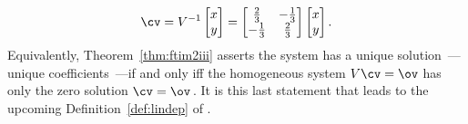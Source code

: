 \begin{example}
\begin{solution}
\begin{equation*}
\cv=V^{-1}\begin{bmatrix} x\\y \end{bmatrix}
=\begin{bmatrix} \frac23&-\frac13\\-\frac13&\frac23 \end{bmatrix}
\begin{bmatrix} x\\y \end{bmatrix}.
\end{equation*}
Equivalently, Theorem~\ref{thm:ftim2iii} asserts the system has a unique solution~\cv---unique coefficients~\cv---if and only iff the {homogeneous} system \(V\cv=\ov\) has only the zero solution \(\cv=\ov\)\,.
It is this last statement that leads to the upcoming Definition~\ref{def:lindep} of .
\end{solution}
\end{example}


